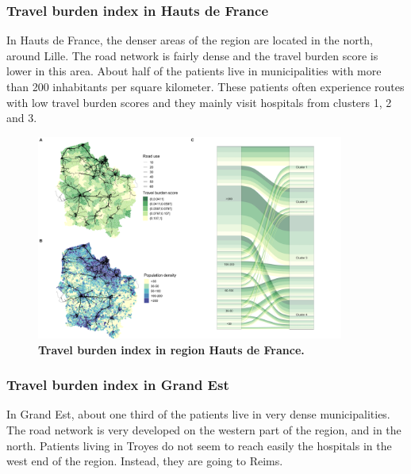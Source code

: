 \subsubsection{Travel burden index in Hauts de France}

In Hauts de France, the denser areas of the region are located in the north,
around Lille. The road network is fairly dense and the travel burden score is
lower in this area. About half of the patients live in municipalities with
more than 200 inhabitants per square kilometer. These patients often experience
routes with low travel burden scores and they mainly visit hospitals from clusters
1, 2 and 3.

\begin{figure}[H]
    \includegraphics[width=0.9\textwidth]{images/routes/fig4_32.png}
    \centering
    \caption{
        \textbf{Travel burden index in region Hauts de France.}
    }
    \label{fig:routes-burden-index-hdf}
\end{figure}

\subsubsection{Travel burden index in Grand Est}

In Grand Est, about one third of the patients live in very dense
municipalities. The road network is very developed on the western part
of the region, and in the north. Patients living in Troyes do not seem to reach
easily the hospitals in the west end of the region. Instead, they are going to
Reims.

